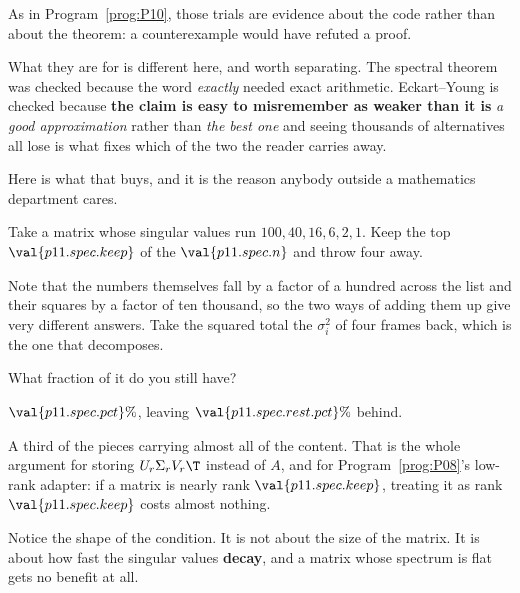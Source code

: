 \begin{fr}
As in Program~\ref{prog:P10}, those trials are evidence about the code rather
than about the theorem: a counterexample would have refuted a proof.

What they are for is different here, and worth separating. The spectral theorem
was checked because the word \emph{exactly} needed exact arithmetic.
Eckart--Young is checked because \textbf{the claim is easy to misremember as
weaker than it is} \dash{} \emph{a good approximation} rather than \emph{the
best one} \dash{} and seeing thousands of alternatives all lose is what fixes
which of the two the reader carries away.
\end{fr}

\begin{fr}
Here is what that buys, and it is the reason anybody outside a mathematics
department cares.

Take a matrix whose singular values run $100, 40, 16, 6, 2, 1$. Keep the top
$\val{p11.spec.keep}$ of the $\val{p11.spec.n}$ and throw four away.

Note that the numbers themselves fall by a factor of a hundred across the list
and their squares by a factor of ten thousand, so the two ways of adding them
up give very different answers. Take the squared total \dash{} the
$\sigma_i^{2}$ of four frames back, which is the one that decomposes.

What fraction of it do you still have?
\dotline
\nextframe
\end{fr}

\begin{fr}
\begin{ansblock}
$\val{p11.spec.pct}\%$, leaving $\val{p11.spec.rest.pct}\%$ behind.
\end{ansblock}

A third of the pieces carrying almost all of the content. That is the whole
argument for storing $U_r\Sigma_r V_r\T$ instead of $A$, and for
Program~\ref{prog:P08}'s low-rank adapter: if a matrix is nearly rank
$\val{p11.spec.keep}$, treating it as rank $\val{p11.spec.keep}$ costs almost
nothing.

Notice the shape of the condition. It is not about the size of the matrix. It
is about how fast the singular values \textbf{decay}, and a matrix whose
spectrum is flat gets no benefit at all.
\end{fr}

